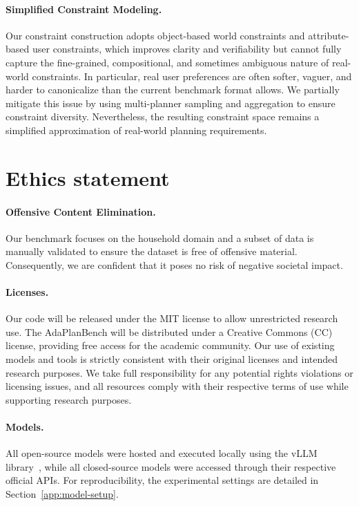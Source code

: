 \documentclass{llmxive}
\providecommand{\bench}[1]{AdaPlanBench}
\begin{document}
\paragraph{Simplified Constraint Modeling.}
Our constraint construction adopts object-based world constraints and attribute-based user constraints, which improves clarity and verifiability but cannot fully capture the fine-grained, compositional, and sometimes ambiguous nature of real-world constraints. In particular, real user preferences are often softer, vaguer, and harder to canonicalize than the current benchmark format allows. We partially mitigate this issue by using multi-planner sampling and aggregation to ensure constraint diversity. Nevertheless, the resulting constraint space remains a simplified approximation of real-world planning requirements.

\section*{Ethics statement}

\paragraph{Offensive Content Elimination.} 
Our benchmark focuses on the household domain and a subset of data is manually validated to ensure the dataset is free of offensive material. Consequently, we are confident that it poses no risk of negative societal impact.

\paragraph{Licenses.} 
Our code will be released under the MIT license to allow unrestricted research use. The \bench{} will be distributed under a Creative Commons (CC) license, providing free access for the academic community. Our use of existing models and tools is strictly consistent with their original licenses and intended research purposes. We take full responsibility for any potential rights violations or licensing issues, and all resources comply with their respective terms of use while supporting research purposes.

\paragraph{Models.} 
All open-source models were hosted and executed locally using the vLLM library~\citep{vllm}, while all closed-source models were accessed through their respective official APIs. 
For reproducibility, the experimental settings are detailed in Section~\ref{app:model-setup}.
\end{document}
